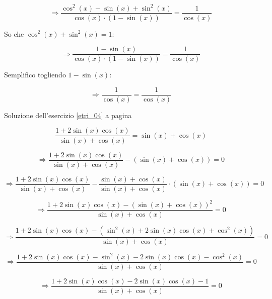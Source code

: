 \begin{minipage}{\textwidth}
\begin{equation*}
\Rightarrow
\frac{
\cos^2(x)-\sin(x)+\sin^2(x)}
{
\cos(x)\cdot
\left(1-\sin(x)\right)
} 
= \frac{1}{\cos(x)}
\end{equation*}

So che $\cos^2(x)+\sin^2(x)=1$:

\begin{equation*}
\Rightarrow
\frac{
1-\sin(x)
}{
\cos(x)\cdot
\left(1-\sin(x)\right)
} 
= \frac{1}{\cos(x)}
\end{equation*}

Semplifico togliendo $1-\sin(x)$:


\begin{equation*}
\Rightarrow
\frac{
1
}{
\cos(x)
} 
= \frac{1}{\cos(x)}
\end{equation*}

\end{minipage}
Soluzione dell'esercizio \ref{etri_04} a pagina \pageref{etri_04}\label{stri_04}

\begin{equation*}
\frac{
1+2\sin(x)\cos(x)
}{
\sin(x)+\cos(x)
}
=
\sin(x)+\cos(x)
\end{equation*}


\begin{equation*}
\Rightarrow
\frac{
1+2\sin(x)\cos(x)
}{
\sin(x)+\cos(x)
}
-(\sin(x)+\cos(x))
=
0
\end{equation*}

\begin{equation*}
\Rightarrow
\frac{
1+2\sin(x)\cos(x)
}{
\sin(x)+\cos(x)
}
-\frac{
\sin(x)+\cos(x)
}{
\sin(x)+\cos(x)
}\cdot(\sin(x)+\cos(x))
=
0
\end{equation*}


\begin{equation*}
\Rightarrow
\frac{
1+2\sin(x)\cos(x)
-(
\sin(x)+\cos(x)
)^2
}{
\sin(x)+\cos(x)
}
=
0
\end{equation*}


\begin{equation*}
\Rightarrow
\frac{
1+2\sin(x)\cos(x)
-(
\sin^2(x)+2\sin(x)\cos(x)+\cos^2(x)
)
}{
\sin(x)+\cos(x)
}
=
0
\end{equation*}


\begin{equation*}
\Rightarrow
\frac{
1+2\sin(x)\cos(x)
-\sin^2(x)-2\sin(x)\cos(x)-\cos^2(x)
}{
\sin(x)+\cos(x)
}
=
0
\end{equation*}


\begin{equation*}
\Rightarrow
\frac{
1+2\sin(x)\cos(x)-2\sin(x)\cos(x)-1
}{
\sin(x)+\cos(x)
}
=
0
\end{equation*}




